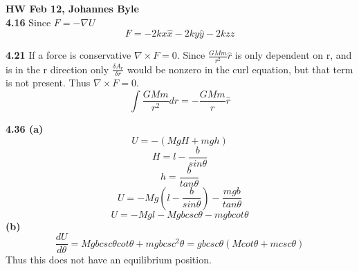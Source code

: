 \documentclass[english]{article}
\begin{document}
\textbf{HW Feb 12, Johannes Byle}\\

\noindent
\textbf{4.16} Since $F=-\nabla U$
$$F=-2kx\hat{x}-2ky\hat{y}-2kz\hat{z}$$

\noindent
\textbf{4.21} If a force is conservative $\nabla\times F=0$. Since $\frac{GMm}{r^2}\hat{r}$ is only dependent on r, and is in the r direction only $\frac{\delta A_r}{\delta r}$ would be nonzero in the curl equation, but that term is not present. Thus $\nabla\times F=0$.
$$\int \frac{GMm}{r^2}dr=-\frac{GMm}{r}\hat{r}$$

\noindent
\textbf{4.36 (a)} $$U=-(MgH+mgh)$$
$$H=l-\frac{b}{sin\theta}$$
$$h=\frac{b}{tan\theta}$$
$$U=-Mg(l-\frac{b}{sin\theta})-\frac{mgb}{tan\theta}$$
$$U=-Mgl-Mgbcsc\theta-mgbcot\theta$$
\textbf{(b)}
$$\frac{dU}{d\theta}=Mgbcsc\theta cot\theta+mgbcsc^2\theta=gbcsc\theta(Mcot\theta+mcsc\theta)$$
Thus this does not have an equilibrium position.
\end{document}
